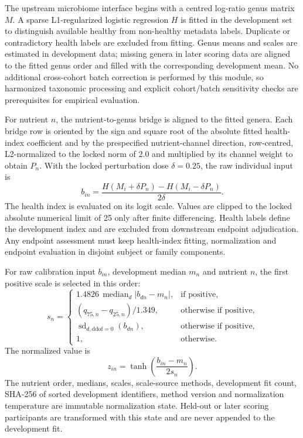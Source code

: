 The upstream microbiome interface begins with a centred log-ratio genus matrix
\(M\). A sparse L1-regularized logistic regression \(H\) is fitted in the development
set to distinguish available healthy from non-healthy metadata labels. Duplicate
or contradictory health labels are excluded from fitting. Genus means and
scales are estimated in development data; missing genera in later scoring data
are aligned to the fitted genus order and filled with the corresponding
development mean. No additional cross-cohort batch correction is performed by
this module, so harmonized taxonomic processing and explicit cohort/batch
sensitivity checks are prerequisites for empirical evaluation.

For nutrient \(n\), the nutrient-to-genus bridge is aligned to the fitted genera.
Each bridge row is oriented by the sign and square root of the absolute fitted
health-index coefficient and by the prespecified nutrient-channel direction,
row-centred, L2-normalized to the locked norm of 2.0 and multiplied by its
channel weight to obtain \(P_n\). With the locked perturbation dose
\(\delta=0.25\), the raw individual
input is
\[
b_{in}=\frac{H(M_i+\delta P_n)-H(M_i-\delta P_n)}{2\delta}.
\]
The health index is evaluated on its logit scale. Values are clipped to the
locked absolute numerical limit of 25 only after finite differencing. Health labels define the
development index and are excluded from downstream endpoint adjudication. Any
endpoint assessment must keep health-index fitting, normalization and endpoint
evaluation in disjoint subject or family components.

For raw calibration input \(b_{in}\), development median \(m_n\) and nutrient
\(n\), the first positive scale is selected in this order:
\[
s_n=
\begin{cases}
1.4826\,\operatorname{median}_d|b_{dn}-m_n|, & \text{if positive},\\
(q_{75,n}-q_{25,n})/1.349, & \text{otherwise if positive},\\
\operatorname{sd}_{d,\mathrm{ddof}=0}(b_{dn}), & \text{otherwise if positive},\\
1, & \text{otherwise}.
\end{cases}
\]
The normalized value is
\[
z_{in}=\tanh\!\left(\frac{b_{in}-m_n}{2s_n}\right).
\]
The nutrient order, medians, scales, scale-source methods, development fit
count, SHA-256 of sorted development identifiers, method version and
normalization temperature are immutable normalization state. Held-out or later
scoring participants are transformed with this state and are never appended to
the development fit.

